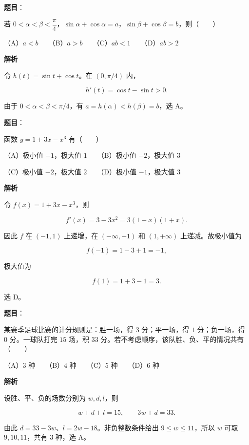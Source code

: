\begin{answer}

\textbf{题目}：

若 $0<\alpha<\beta<\dfrac\pi4$，$\sin\alpha+\cos\alpha=a$，$\sin\beta+\cos\beta=b$，则\mbox{（　　）}

（A）$a<b$　　（B）$a>b$　　（C）$ab<1$　　（D）$ab>2$

\textbf{解析}

令 $h(t)=\sin t+\cos t$。在 $(0,\pi/4)$ 内，

\nopagebreak[4]
\[
h'(t)=\cos t-\sin t>0.
\]

由于 $0<\alpha<\beta<\pi/4$，有 $a=h(\alpha)<h(\beta)=b$，选 A。


\end{answer}
\begin{answer}

\textbf{题目}：

函数 $y=1+3x-x^3$ 有\mbox{（　　）}

（A）极小值 $-1$，极大值 $1$　　（B）极小值 $-2$，极大值 $3$

（C）极小值 $-2$，极大值 $2$　　（D）极小值 $-1$，极大值 $3$

\textbf{解析}

令 $f(x)=1+3x-x^3$，则

\nopagebreak[4]
\[
f'(x)=3-3x^2=3(1-x)(1+x).
\]

因此 $f$ 在 $(-1,1)$ 上递增，在 $(-\infty,-1)$ 和 $(1,+\infty)$ 上递减。故极小值为

\nopagebreak[4]
\[
f(-1)=1-3+1=-1,
\]

极大值为

\nopagebreak[4]
\[
f(1)=1+3-1=3.
\]

选 D。


\end{answer}
\begin{answer}

\textbf{题目}：

某赛季足球比赛的计分规则是：胜一场，得 $3$ 分；平一场，得 $1$ 分；负一场，得 $0$ 分。一球队打完 $15$ 场，积 $33$ 分。若不考虑顺序，该队胜、负、平的情况共有\mbox{（　　）}

（A）$3$ 种　　（B）$4$ 种　　（C）$5$ 种　　（D）$6$ 种

\textbf{解析}

设胜、平、负的场数分别为 $w,d,l$，则

\nopagebreak[4]
\[
w+d+l=15,\qquad 3w+d=33.
\]

由此 $d=33-3w$、$l=2w-18$。非负整数条件给出 $9\le w\le11$，所以 $w$ 可取 $9,10,11$，共有 $3$ 种，选 A。


\end{answer}
